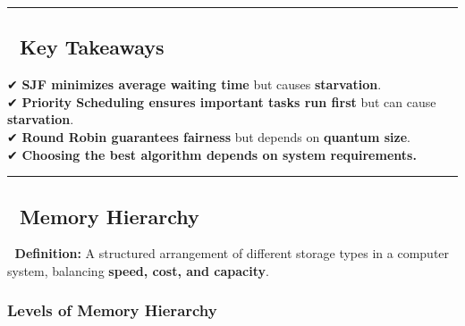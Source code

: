 \documentclass[
]{article}
\begin{document}
\begin{center}\rule{0.5\linewidth}{0.5pt}\end{center}

\subsection{\texorpdfstring{\textbf{📌 Key
Takeaways}}{📌 Key Takeaways}}\label{key-takeaways-1}

✔ \textbf{SJF minimizes average waiting time} but causes
\textbf{starvation}.\\
✔ \textbf{Priority Scheduling ensures important tasks run first} but can
cause \textbf{starvation}.\\
✔ \textbf{Round Robin guarantees fairness} but depends on
\textbf{quantum size}.\\
✔ \textbf{Choosing the best algorithm depends on system requirements.}

\begin{center}\rule{0.5\linewidth}{0.5pt}\end{center}

\subsection{\texorpdfstring{\textbf{📌 Memory
Hierarchy}}{📌 Memory Hierarchy}}\label{memory-hierarchy}

📌 \textbf{Definition:} A structured arrangement of different storage
types in a computer system, balancing \textbf{speed, cost, and
capacity}.

\subsubsection{\texorpdfstring{\textbf{Levels of Memory
Hierarchy}}{Levels of Memory Hierarchy}}\label{levels-of-memory-hierarchy-1}
\end{document}
